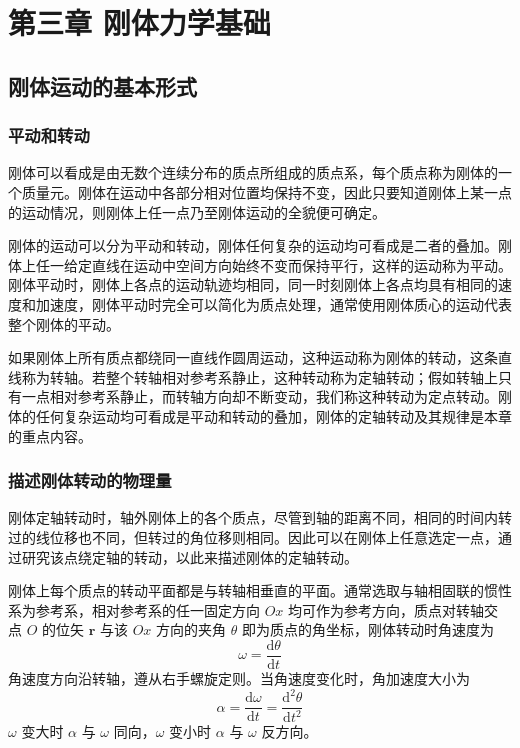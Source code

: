 \chapter{第三章 刚体力学基础}

\section{刚体运动的基本形式}
    \subsection{平动和转动}
    刚体可以看成是由无数个连续分布的质点所组成的质点系，每个质点称为刚体的一个质量元。刚体在运动中各部分相对位置均保持不变，因此只要知道刚体上某一点的运动情况，则刚体上任一点乃至刚体运动的全貌便可确定。

    刚体的运动可以分为平动和转动，刚体任何复杂的运动均可看成是二者的叠加。刚体上任一给定直线在运动中空间方向始终不变而保持平行，这样的运动称为平动。刚体平动时，刚体上各点的运动轨迹均相同，同一时刻刚体上各点均具有相同的速度和加速度，刚体平动时完全可以简化为质点处理，通常使用刚体质心的运动代表整个刚体的平动。

    如果刚体上所有质点都绕同一直线作圆周运动，这种运动称为刚体的转动，这条直线称为转轴。若整个转轴相对参考系静止，这种转动称为定轴转动；假如转轴上只有一点相对参考系静止，而转轴方向却不断变动，我们称这种转动为定点转动。刚体的任何复杂运动均可看成是平动和转动的叠加，刚体的定轴转动及其规律是本章的重点内容。

    \subsection{描述刚体转动的物理量}
    刚体定轴转动时，轴外刚体上的各个质点，尽管到轴的距离不同，相同的时间内转过的线位移也不同，但转过的角位移则相同。因此可以在刚体上任意选定一点，通过研究该点绕定轴的转动，以此来描述刚体的定轴转动。

    刚体上每个质点的转动平面都是与转轴相垂直的平面。通常选取与轴相固联的惯性系为参考系，相对参考系的任一固定方向 $Ox$ 均可作为参考方向，质点对转轴交点 $O$ 的位矢 $\boldsymbol{r}$ 与该 $Ox$ 方向的夹角 $\theta$ 即为质点的角坐标，刚体转动时角速度为
    \[
    \omega=\frac{\mathrm{d}\theta}{\mathrm{d}t}
    \]
    角速度方向沿转轴，遵从右手螺旋定则。当角速度变化时，角加速度大小为
    \[
    \alpha=\frac{\mathrm{d}\omega}{\mathrm{d}t}=\frac{\mathrm{d}^2\theta}{\mathrm{d}t^2}
    \]
    $\omega$ 变大时 $\alpha$ 与 $\omega$ 同向，$\omega$ 变小时 $\alpha$ 与 $\omega$ 反方向。

